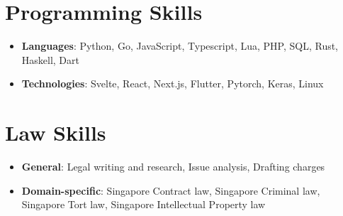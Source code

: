 \documentclass[letterpaper,11pt]{article}
\newcommand{\resumeItem}[2]{
  \item\small{
    \textbf{#1}{: #2 \vspace{-2pt}}
  }
}
\newcommand{\resumeSubItem}[2]{\resumeItem{#1}{#2}\vspace{-4pt}}
\newcommand{\resumeSubHeadingListStart}{\begin{itemize}[leftmargin=*]}
\newcommand{\resumeSubHeadingListEnd}{\end{itemize}}
\begin{document}
\section{Programming Skills}
 \resumeSubHeadingListStart
   \resumeSubItem{Languages}
      {Python, Go, JavaScript, Typescript, Lua, PHP, SQL, Rust, Haskell, Dart}
   \resumeSubItem{Technologies}
      {Svelte, React, Next.js, Flutter, Pytorch, Keras, Linux}
 \resumeSubHeadingListEnd

 \section{Law Skills}
 \resumeSubHeadingListStart
   \resumeSubItem{General}
      {Legal writing and research, Issue analysis, Drafting charges}
   \resumeSubItem{Domain-specific}
      {Singapore Contract law, Singapore Criminal law, Singapore Tort law, Singapore Intellectual Property law}
 \resumeSubHeadingListEnd

\end{document}
